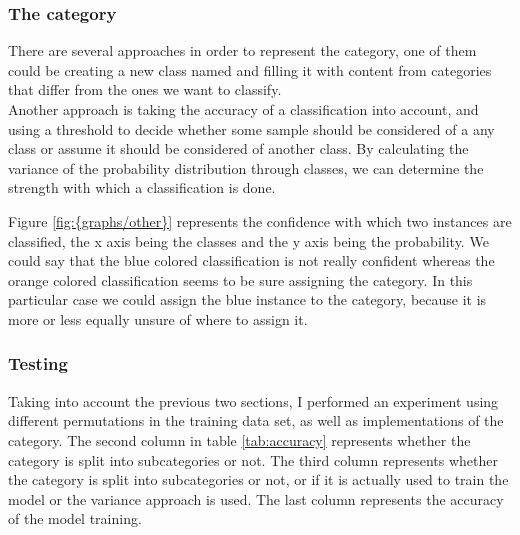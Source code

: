  

\subsubsection{The  category}
There are several approaches in order to represent the  category, one of them could be creating a new class named  and filling it with content from categories that 
differ from the ones we want to classify.\\
Another approach is taking the accuracy of a classification into account, and using a threshold to decide whether some sample should be considered of a any class or assume it should be considered of 
another class. 
By calculating the variance of the probability distribution through classes, we can determine the strength with which a classification is done.   


Figure \ref{fig:{graphs/other}} represents the confidence with which two instances are classified, the x axis being the classes
and the y axis being the probability. We could say that the blue colored classification is not really confident whereas the orange colored classification seems to be sure assigning the  
category. In this particular case we could assign the blue instance to the  category, because it is more or less equally unsure of where to assign it.


\subsubsection{Testing}
Taking into account the previous two sections, I performed an experiment using different permutations in the training data set, as well as implementations of the  category. 
The second column in table \ref{tab:accuracy} represents whether the  category is split into subcategories or not. The third column represents whether the  category
is split into subcategories or not, or if it is actually used to train the model or the variance approach is used. The last column represents the accuracy of the model training. \\
 
